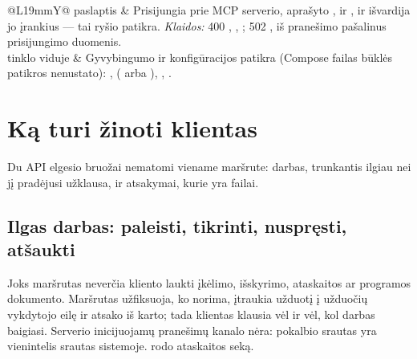 \begin{xltabular}{\textwidth}{@{}L{19mm}Y@{}}
\addlinespace
{}
paslaptis & Prisijungia prie MCP serverio, aprašyto ,  ir
  , ir išvardija jo įrankius --- tai  ryšio
  patikra. \emph{Klaidos:} 400 , ,
  ; 502 , iš pranešimo pašalinus prisijungimo
  duomenis. \\
\addlinespace
{}
tinklo viduje & Gyvybingumo ir konfigūracijos patikra (Compose failas būklės patikros nenustato): ,
   ( arba ), ,
  . \\
\end{xltabular}


\section{Ką turi žinoti klientas}\label{sec:api:client}

Du API elgesio bruožai nematomi viename maršrute: darbas, trunkantis ilgiau nei jį pradėjusi
užklausa, ir atsakymai, kurie yra failai.

\subsection{Ilgas darbas: paleisti, tikrinti, nuspręsti, atšaukti}\label{sec:api:polling}

Joks maršrutas neverčia kliento laukti įkėlimo, išskyrimo, ataskaitos ar programos dokumento.
Maršrutas užfiksuoja, ko norima, įtraukia užduotį į užduočių vykdytojo eilę ir atsako iš karto;
tada klientas klausia vėl ir vėl, kol darbas baigiasi. Serverio inicijuojamų pranešimų kanalo nėra: pokalbio
srautas yra vienintelis srautas sistemoje.  rodo ataskaitos seką.

